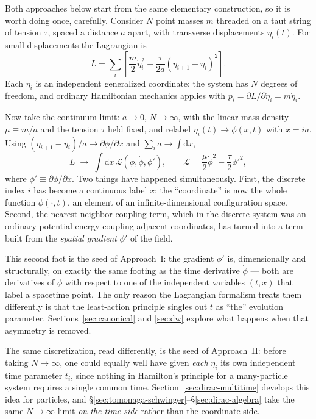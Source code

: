 \documentclass[11pt]{book}
\newcommand{\rd}{\mathrm{d}}
\newcommand{\Lag}{\mathcal{L}}
\theoremstyle{definition}
\theoremstyle{remark}
\begin{document}
Both approaches below start from the same elementary construction, so it is worth doing once, carefully. Consider $N$ point masses $m$ threaded on a taut string of tension $\tau$, spaced a distance $a$ apart, with transverse displacements $\eta_i(t)$. For small displacements the Lagrangian is
\begin{equation}
L = \sum_{i} \left[\frac{m}{2}\dot\eta_i^2 - \frac{\tau}{2a}(\eta_{i+1}-\eta_i)^2\right].
\end{equation}
Each $\eta_i$ is an independent generalized coordinate; the system has $N$ degrees of freedom, and ordinary Hamiltonian mechanics applies with $p_i=\partial L/\partial\dot\eta_i = m\dot\eta_i$.

Now take the continuum limit: $a\to0$, $N\to\infty$, with the linear mass density $\mu \equiv m/a$ and the tension $\tau$ held fixed, and relabel $\eta_i(t)\to \phi(x,t)$ with $x=ia$. Using $(\eta_{i+1}-\eta_i)/a \to \partial\phi/\partial x$ and $\sum_i a \to \int \rd x$,
\begin{equation}
L \;\longrightarrow\; \int \rd x\, \Lag(\phi,\dot\phi,\phi'), \qquad
\Lag = \frac{\mu}{2}\dot\phi^2 - \frac{\tau}{2}\phi'^2 ,
\label{eq:string-lagrangian}
\end{equation}
where $\phi'\equiv\partial\phi/\partial x$. Two things have happened simultaneously. First, the discrete index $i$ has become a continuous label $x$: the ``coordinate'' is now the whole function $\phi(\cdot,t)$, an element of an infinite-dimensional configuration space. Second, the nearest-neighbor coupling term, which in the discrete system was an ordinary potential energy coupling adjacent coordinates, has turned into a term built from the \emph{spatial gradient} $\phi'$ of the field.

This second fact is the seed of Approach~I: the gradient $\phi'$ is, dimensionally and structurally, on exactly the same footing as the time derivative $\dot\phi$ --- both are derivatives of $\phi$ with respect to one of the independent variables $(t,x)$ that label a spacetime point. The only reason the Lagrangian formalism treats them differently is that the least-action principle singles out $t$ as ``the'' evolution parameter. Sections~\ref{sec:canonical} and \ref{sec:dw} explore what happens when that asymmetry is removed.

The same discretization, read differently, is the seed of Approach~II: before taking $N\to\infty$, one could equally well have given \emph{each} $\eta_i$ its own independent time parameter $t_i$, since nothing in Hamilton's principle for a many-particle system requires a single common time. Section~\ref{sec:dirac-multitime} develops this idea for particles, and \S\ref{sec:tomonaga-schwinger}--\S\ref{sec:dirac-algebra} take the same $N\to\infty$ limit \emph{on the time side} rather than the coordinate side.
\end{document}
